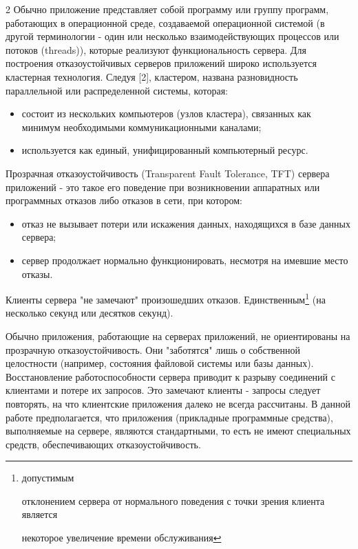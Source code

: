 \begin{multicols}{2}
Обычно приложение представляет собой программу или группу программ, работающих в операционной среде, создаваемой операционной системой (в другой терминологии - один или несколько взаимодействующих процессов или потоков (threads)), которые реализуют функциональность сервера. Для построения отказоустойчивых серверов приложений широко используется кластерная технология. Следуя [2], кластером, названа разновидность параллельной или распределенной системы, которая:

\begin{itemize}

\item состоит из нескольких компьютеров (узлов кластера), связанных как минимум необходимыми коммуникационными каналами;

\item используется как единый, унифицированный компьютерный ресурс.

\end{itemize}



Прозрачная отказоустойчивость (Transparent Fault Tolerance, TFT) сервера приложений - это такое его поведение при возникновении аппаратных или программных отказов либо отказов в сети, при котором:

\begin{itemize}

\item отказ не вызывает потери или искажения данных, находящихся в базе данных сервера;

\item сервер продолжает нормально функционировать, несмотря на имевшие место отказы.

\end{itemize}



Клиенты сервера "не замечают" произошедших отказов. Единственным\footnote{допустимым

отклонением сервера от нормального поведения с точки зрения клиента является

некоторое увеличение времени обслуживания} (на несколько секунд или десятков секунд).



Обычно приложения, работающие на серверах приложений, не ориентированы на прозрачную отказоустойчивость. Они "заботятся" лишь о собственной целостности (например, состояния файловой системы или базы данных). Восстановление работоспособности сервера приводит к разрыву соединений с клиентами и потере их запросов. Это замечают клиенты - запросы следует повторять, на что клиентские приложения далеко не всегда рассчитаны. В данной работе предполагается, что приложения (прикладные программные средства), выполняемые на сервере, являются стандартными, то есть не имеют специальных средств, обеспечивающих отказоустойчивость.


\end{multicols}
